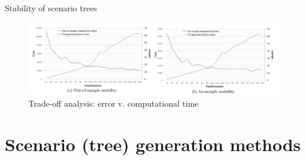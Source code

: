 
\begin{frame}{Stability of scenario trees}
	\centering
	\begin{figure}
	\includegraphics[width=1\textwidth]{figures/scen_stability.pdf}
	\vspace{6pt}
	\caption{Trade-off analysis: error v. computational time \cite{dillon2017two}}
	\end{figure}
\end{frame}



\section{Scenario (tree) generation methods}


